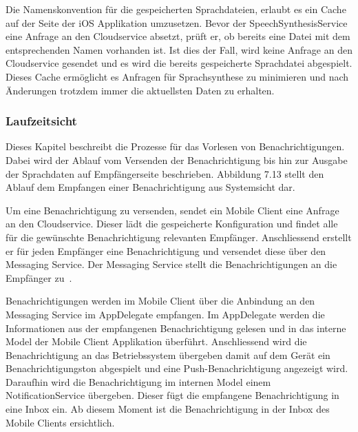 Die Namenskonvention für die gespeicherten Sprachdateien, erlaubt es ein Cache auf der Seite der iOS Applikation umzusetzen.
Bevor der SpeechSynthesisService eine Anfrage an den Cloudservice absetzt, prüft er, ob bereits eine Datei mit dem entsprechenden Namen vorhanden ist.
Ist dies der Fall, wird keine Anfrage an den Cloudservice gesendet und es wird die bereits gespeicherte Sprachdatei abgespielt.
Dieses Cache ermöglicht es Anfragen für Sprachsynthese zu minimieren und nach Änderungen trotzdem immer die aktuellsten Daten zu erhalten.

\subsubsection{Laufzeitsicht}

Dieses Kapitel beschreibt die Prozesse für das Vorlesen von Benachrichtigungen.
Dabei wird der Ablauf vom Versenden der Benachrichtigung bis hin zur Ausgabe der Sprachdaten auf Empfängerseite beschrieben.
Abbildung 7.13 stellt den Ablauf dem Empfangen einer Benachrichtigung aus Systemsicht dar.

Um eine Benachrichtigung zu versenden, sendet ein Mobile Client eine Anfrage an den Cloudservice.
Dieser lädt die gespeicherte Konfiguration und findet alle für die gewünschte Benachrichtigung relevanten Empfänger.
Anschliessend erstellt er für jeden Empfänger eine Benachrichtigung und versendet diese über den Messaging Service.
Der Messaging Service stellt die Benachrichtigungen an die Empfänger zu~\cite{ip5}.

Benachrichtigungen werden im Mobile Client über die Anbindung an den Messaging Service im AppDelegate empfangen.
Im AppDelegate werden die Informationen aus der empfangenen Benachrichtigung gelesen und in das interne Model der Mobile Client Applikation überführt.
Anschliessend wird die Benachrichtigung an das Betriebssystem übergeben damit auf dem Gerät ein Benachrichtigungston abgespielt und eine Push-Benachrichtigung angezeigt wird.
Daraufhin wird die Benachrichtigung im internen Model einem NotificationService übergeben.
Dieser fügt die empfangene Benachrichtigung in eine Inbox ein.
Ab diesem Moment ist die Benachrichtigung in der Inbox des Mobile Clients ersichtlich.

